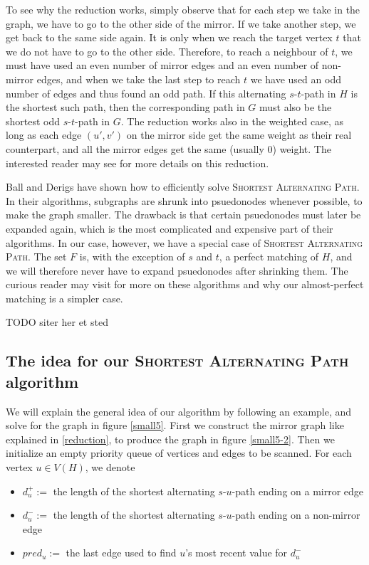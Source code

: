 To see why the reduction works, simply observe that for each step we take in the graph, we have to go to the other side of the mirror. If we take another step, we get back to the same side again. It is only when we reach the target vertex $t$ that we do not have to go to the other side. Therefore, to reach a neighbour of $t$, we must have used an even number of mirror edges and an even number of non-mirror edges, and when we take the last step to reach $t$ we have used an odd number of edges and thus found an odd path. If this alternating $s$-$t$-path in $H$ is the shortest such path, then the corresponding path in $G$ must also be the shortest odd $s$-$t$-path in $G$. The reduction works also in the weighted case, as long as each edge $(u',v')$ on the mirror side get the same weight as their real counterpart, and all the mirror edges get the same (usually 0) weight. The interested reader may see \cite{derigs_shortest_odd_path} for more details on this reduction.

Ball and Derigs \cite{shortest_alternating_path} have shown how to efficiently solve \textsc{Shortest Alternating Path}. In their algorithms, subgraphs are shrunk into psuedonodes whenever possible, to make the graph smaller. The drawback is that certain psuedonodes must later be expanded again, which is the most complicated and expensive part of their algorithms. In our case, however, we have a special case of \textsc{Shortest Alternating Path}. The set $F$ is, with the exception of $s$ and $t$, a perfect matching of $H$, and we will therefore never have to expand psuedonodes after shrinking them. The curious reader may visit \cite{shortest_alternating_path} for more on these algorithms and why our almost-perfect matching is a simpler case.

TODO siter \cite{blossom} her et sted

\subsection{The idea for our \textsc{Shortest Alternating Path} algorithm}
We will explain the general idea of our algorithm by following an example, and solve for the graph in figure \ref{small5}. First we construct the mirror graph like explained in \ref{reduction}, to produce the graph in figure \ref{small5-2}. Then we initialize an empty priority queue of vertices and edges to be scanned. For each vertex $u \in V(H)$, we denote
\begin{itemize}
    \item $d^+_u :=$ the length of the shortest alternating $s$-$u$-path ending on a mirror edge
    \item $d^-_u :=$ the length of the shortest alternating $s$-$u$-path ending on a non-mirror edge
    \item $pred_u :=$ the last edge used to find $u$'s most recent value for $d^-_u$
\end{itemize}

